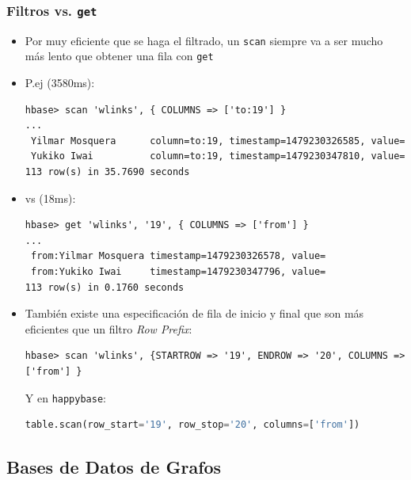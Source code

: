 \documentclass[14pt]{beamer}
\begin{document}
\begin{frame}
\begin{itemize}
\begin{frame}
  \frametitle{Filtros vs. {\tt get}}
  \begin{itemize}
  \item Por muy eficiente que se haga el filtrado, un {\tt scan} siempre va
    a ser mucho más lento que obtener una fila con {\tt get}
  \item P.ej (3580ms):
\begin{lstlisting}
hbase> scan 'wlinks', { COLUMNS => ['to:19'] }
...
 Yilmar Mosquera      column=to:19, timestamp=1479230326585, value=
 Yukiko Iwai          column=to:19, timestamp=1479230347810, value=
113 row(s) in 35.7690 seconds
\end{lstlisting}

    \framebreak

  \item vs (18ms):
\begin{lstlisting}
hbase> get 'wlinks', '19', { COLUMNS => ['from'] }
...
 from:Yilmar Mosquera timestamp=1479230326578, value=
 from:Yukiko Iwai     timestamp=1479230347796, value=
113 row(s) in 0.1760 seconds
\end{lstlisting}

  \item También existe una especificación de fila de inicio y final que son
    más eficientes que un filtro {\em Row Prefix}:

\begin{lstlisting}
hbase> scan 'wlinks', {STARTROW => '19', ENDROW => '20', COLUMNS => ['from'] }
\end{lstlisting}

    Y en {\tt happybase}:

\begin{lstlisting}[language=Python]
table.scan(row_start='19', row_stop='20', columns=['from'])
\end{lstlisting}

  \end{itemize}
\end{frame}



\subsection{Bases de Datos de Grafos}


\end{itemize}
\end{frame}
\end{document}
